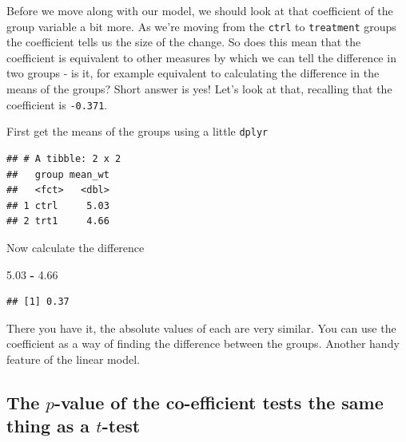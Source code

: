 \documentclass[
]{book}
\newenvironment{Shaded}{\begin{snugshade}}{\end{snugshade}}
\newcommand{\DataTypeTok}[1]{\textcolor[rgb]{0.13,0.29,0.53}{#1}}
\newcommand{\FloatTok}[1]{\textcolor[rgb]{0.00,0.00,0.81}{#1}}
\newcommand{\KeywordTok}[1]{\textcolor[rgb]{0.13,0.29,0.53}{\textbf{#1}}}
\newcommand{\NormalTok}[1]{#1}
\newcommand{\OperatorTok}[1]{\textcolor[rgb]{0.81,0.36,0.00}{\textbf{#1}}}
\newcommand{\StringTok}[1]{\textcolor[rgb]{0.31,0.60,0.02}{#1}}
\begin{document}
Before we move along with our model, we should look at that coefficient of the group variable a bit more. As we're moving from the \texttt{ctrl} to \texttt{treatment} groups the coefficient tells us the size of the change. So does this mean that the coefficient is equivalent to other measures by which we can tell the difference in two groups - is it, for example equivalent to calculating the difference in the means of the groups? Short answer is yes! Let's look at that, recalling that the coefficient is \texttt{-0.371}.

First get the means of the groups using a little \texttt{dplyr}

\begin{Shaded}
\end{Shaded}

\begin{verbatim}
## # A tibble: 2 x 2
##   group mean_wt
##   <fct>   <dbl>
## 1 ctrl     5.03
## 2 trt1     4.66
\end{verbatim}

Now calculate the difference

\begin{Shaded}
\begin{Highlighting}[]
\FloatTok{5.03} \OperatorTok{-}\StringTok{ }\FloatTok{4.66}
\end{Highlighting}
\end{Shaded}

\begin{verbatim}
## [1] 0.37
\end{verbatim}

There you have it, the absolute values of each are very similar. You can use the coefficient as a way of finding the difference between the groups. Another handy feature of the linear model.

\hypertarget{the-p-value-of-the-co-efficient-tests-the-same-thing-as-a-t-test}{%
\subsection{\texorpdfstring{The \(p\)-value of the co-efficient tests the same thing as a \(t\)-test}{The p-value of the co-efficient tests the same thing as a t-test}}\label{the-p-value-of-the-co-efficient-tests-the-same-thing-as-a-t-test}}
\end{document}
